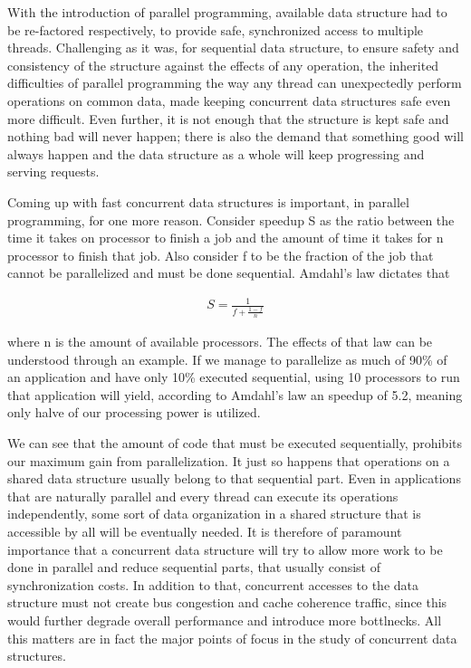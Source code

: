 With the introduction of parallel programming,  available data structure had to be re-factored respectively, to provide safe, synchronized access to multiple threads. Challenging as it was, for sequential data structure, to ensure safety and consistency of the structure against the effects of any operation, the inherited difficulties of parallel programming the way any thread can unexpectedly perform operations on common data, made keeping concurrent data structures safe even more difficult. Even further, it is not enough that the structure is kept safe and nothing bad will never happen; there is also the demand that something good will always happen and the data structure as a whole will keep progressing and serving requests. 

Coming up with fast concurrent data structures is  important, in parallel programming, for one more reason. Consider speedup S as the ratio between the time it takes on processor to finish a job and the amount of time it takes for n processor to finish that job. Also consider f to be the fraction of the job  that cannot be parallelized and must be done sequential. Amdahl's law dictates that 

\begin{align*}
	S = \frac{1}{f + \frac{1-f}{n}}
\end{align*}

where n is the amount of available processors. The effects of that law can be understood through an example. If we manage to parallelize as much of 90\% of an application and have only 10\% executed sequential, using 10 processors to run that application will yield, according to Amdahl's law an speedup of 5.2, meaning only halve of our processing power is utilized. 

We can see that the amount of code that must be executed sequentially, prohibits our maximum gain from parallelization. It just so happens that operations on a shared data structure usually belong to that sequential part. Even in applications that are naturally parallel and every thread can execute its operations independently, some sort of data organization in a shared structure that is accessible by all will be eventually needed.  It is therefore of paramount importance that a concurrent data structure will try to allow more work to be done in parallel and reduce sequential parts, that usually consist of synchronization costs. In addition to that, concurrent accesses to the data structure must not create bus congestion and cache coherence traffic, since this would further degrade overall performance and introduce more bottlnecks. All this matters are in fact the major points of focus in the study of concurrent data structures.

